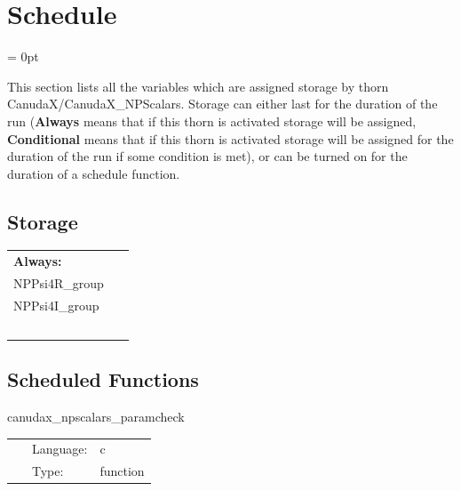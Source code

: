 
\section{Schedule} 


\parskip = 0pt


\noindent This section lists all the variables which are assigned storage by thorn CanudaX/CanudaX\_NPScalars.  Storage can either last for the duration of the run ({\bf Always} means that if this thorn is activated storage will be assigned, {\bf Conditional} means that if this thorn is activated storage will be assigned for the duration of the run if some condition is met), or can be turned on for the duration of a schedule function.


\subsection*{Storage}

\hspace{5mm}

 \begin{tabular*}{160mm}{ll} 

{\bf Always:}&  ~ \\ 
 NPPsi4R\_group & ~\\ 
 NPPsi4I\_group & ~\\ 
~ & ~\\ 
\end{tabular*} 


\subsection*{Scheduled Functions}
\vspace{5mm}


\hspace{5mm} canudax\_npscalars\_paramcheck 

\hspace{5mm}{\it check canudax\_npscalars parameters for consistency } 


\hspace{5mm}

 \begin{tabular*}{160mm}{cll} 
~ & Language:  & c \\ 
~ & Type:  & function \\ 
\end{tabular*} 


\vspace{5mm}


